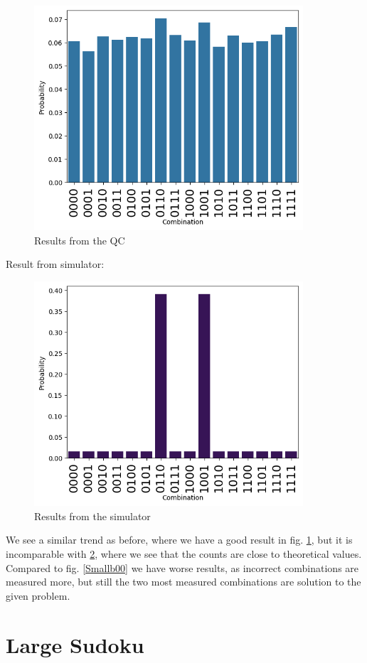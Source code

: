 \begin{figure}[h]
\centering
\includegraphics[width=10cm]{Figures/bc1_0.png}
\caption{Results from the QC}
\label{Smallb10}
\end{figure}
Result from simulator:
\begin{figure}[H]
\centering
\includegraphics[width=10cm]{Figures/sim1.png}
\caption{Results from the simulator}
\label{sim1}
\end{figure}

We see a similar trend as before, where we have a good result in fig. \ref{Smallb10}, but it is incomparable with \ref{sim1}, where we see that the counts are close to theoretical values. Compared to fig. \ref{Smallb00} we have worse results, as incorrect combinations are measured more, but still the two most measured combinations are solution to the given problem.
\section{Large Sudoku}

